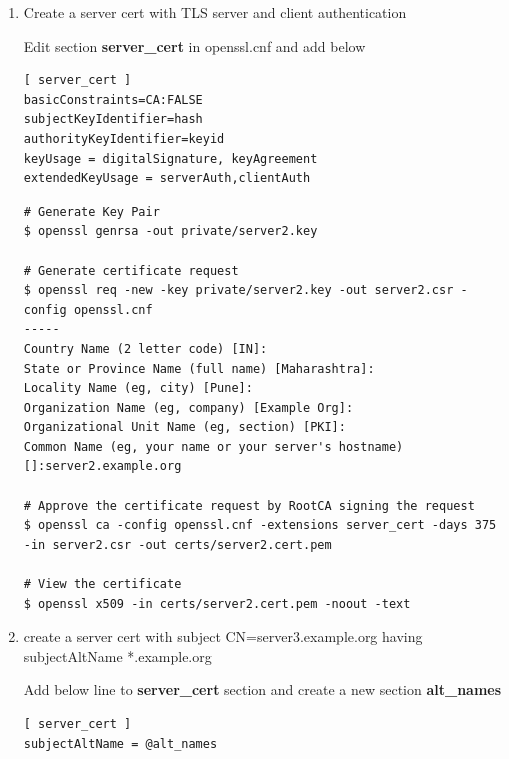 \documentclass[a4paper]{article}
\begin{document}
\begin{enumerate}[label*=\arabic*.]
\begin{lstlisting}[style=bashInputStyle]
# Generate Certificate request
$ openssl req -new -key private/pkiuser4.key -out pkiuser4.csr -config openssl.cnf

# Approve the certificate request by Example subca1.1.1 signing the request
$ openssl ca -keyfile private/subca1.1.1.key \
    -cert certs/subca1.1.1.cert.pem -config openssl.cnf \
    -extensions usr_cert -days 375 -in pkiuser4.csr \
    -out certs/pkiuser4.cert.pem

# View the certificate 
$ openssl x509 -in certs/pkiuser4.cert.pem -noout -text
        \end{lstlisting}

    \item Create a server cert with TLS server and client authentication

        Edit section \textbf{server\_cert} in openssl.cnf and add below
        \begin{lstlisting}
[ server_cert ]
basicConstraints=CA:FALSE
subjectKeyIdentifier=hash
authorityKeyIdentifier=keyid
keyUsage = digitalSignature, keyAgreement
extendedKeyUsage = serverAuth,clientAuth
        \end{lstlisting}
        \begin{lstlisting}[style=bashInputStyle]
# Generate Key Pair
$ openssl genrsa -out private/server2.key        

# Generate certificate request
$ openssl req -new -key private/server2.key -out server2.csr -config openssl.cnf
-----
Country Name (2 letter code) [IN]:
State or Province Name (full name) [Maharashtra]:
Locality Name (eg, city) [Pune]:
Organization Name (eg, company) [Example Org]:
Organizational Unit Name (eg, section) [PKI]:
Common Name (eg, your name or your server's hostname) []:server2.example.org

# Approve the certificate request by RootCA signing the request
$ openssl ca -config openssl.cnf -extensions server_cert -days 375 -in server2.csr -out certs/server2.cert.pem

# View the certificate
$ openssl x509 -in certs/server2.cert.pem -noout -text
        \end{lstlisting}

    \item create a server cert with subject CN=server3.example.org having subjectAltName *.example.org
        
        Add below line to \textbf{server\_cert} section and create a new section \textbf{alt\_names}
        \begin{lstlisting}
[ server_cert ]
subjectAltName = @alt_names


\end{lstlisting}
\end{enumerate}
\end{document}
